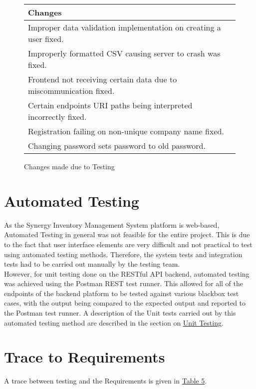 \documentclass[12pt, titlepage]{article}
\begin{document}
\begin{figure}[h]
\centering
\caption{Changes made due to Testing}
\label{fig:table4}
\begin{tabular}{ p{\linewidth} }
\hline
\textbf{Changes}\\
\hline
Improper data validation implementation on creating a user fixed.\\
Improperly formatted CSV causing server to crash was fixed.\\
Frontend not receiving certain data due to miscommunication fixed.\\
Certain endpoints URI paths being interpreted incorrectly fixed.\\
Registration failing on non-unique company name fixed.\\
Changing password sets password to old password.\\
\hline
\end{tabular}
\end{figure}

\section{Automated Testing}
As the Synergy Inventory Management System platform is web-based, Automated Testing in general was not feasible for the entire project. This is due to the fact that user interface elements are very difficult and not practical to test using automated testing methods. Therefore, the system tests and integration tests had to be carried out manually by the testing team.\\

However, for unit testing done on the RESTful API backend, automated testing was achieved using the Postman REST test runner. This allowed for all of the endpoints of the backend platform to be tested against various blackbox test cases, with the output being compared to the expected output and reported to the Postman test runner. A description of the Unit tests carried out by this automated testing method are described in the section on \hyperref[sec:unittesting]{Unit Testing}.
		
\section{Trace to Requirements}
A trace between testing and the Requirements is given in \hyperref[fig:table5]{Table 5}.
\end{document}
